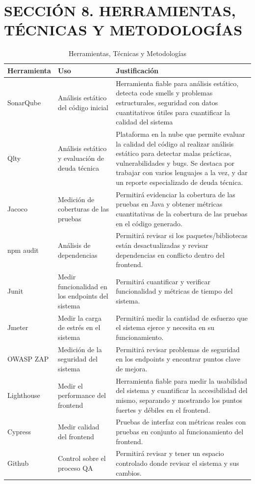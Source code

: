 ﻿\section{SECCIÓN 8. HERRAMIENTAS, TÉCNICAS Y METODOLOGÍAS}

\begin{table}[H]
\centering
\caption{Herramientas, Técnicas y Metodologías}
\label{tab:tools}
\begin{tabular}{|p{3cm}|p{4cm}|p{6cm}|}
\hline
\textbf{Herramienta} & \textbf{Uso} & \textbf{Justificación} \\
\hline
SonarQube & Análisis estático del código inicial & Herramienta fiable para análisis estático, detecta code smells y problemas estructurales, seguridad con datos cuantitativos útiles para cuantificar la calidad del sistema \\
\hline
Qlty & Análisis estático y evaluación de deuda técnica & Plataforma en la nube que permite evaluar la calidad del código al realizar análisis estático para detectar malas prácticas, vulnerabilidades y bugs. Se destaca por trabajar con varios lenguajes a la vez, y dar un reporte especializado de deuda técnica. \\
\hline
Jacoco & Medición de coberturas de las pruebas & Permitirá evidenciar la cobertura de las pruebas en Java y obtener métricas cuantitativas de la cobertura de las pruebas en el código generado. \\
\hline
npm audit & Análisis de dependencias & Permitirá revisar si los paquetes/bibliotecas están desactualizadas y revisar dependencias en conflicto dentro del frontend. \\
\hline
Junit & Medir funcionalidad en los endpoints del sistema & Permitirá cuantificar y verificar funcionalidad y métricas de tiempo del sistema. \\
\hline
Jmeter & Medir la carga de estrés en el sistema & Permitirá medir la cantidad de esfuerzo que el sistema ejerce y necesita en su funcionamiento. \\
\hline
OWASP ZAP & Medición de la seguridad del sistema & Permitirá revisar problemas de seguridad en los endpoints y encontrar puntos clave de mejora. \\
\hline
Lighthouse & Medir el performance del frontend & Herramienta fiable para medir la usabilidad del sistema y cuantificar la accesibilidad del mismo, separando y mostrando los puntos fuertes y débiles en el frontend. \\
\hline
Cypress & Medir calidad del frontend & Pruebas de interfaz con métricas reales con pruebas en conjunto al funcionamiento del frontend. \\
\hline
Github & Control sobre el proceso QA & Permitirá revisar y tener un espacio controlado donde revisar el sistema y sus cambios. \\
\hline
\end{tabular}
\end{table}
